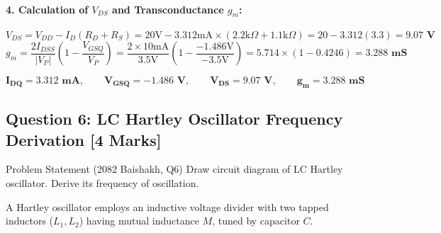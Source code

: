\documentclass[11pt,a4paper,oneside]{book}
\begin{document}
\paragraph{4. Calculation of $V_{DS}$ and Transconductance $g_m$:}
\[
V_{DS} = V_{DD} - I_D(R_D + R_S) = 20\text{V} - 3.312\text{mA} \times (2.2\text{k}\Omega + 1.1\text{k}\Omega) = 20 - 3.312(3.3) = \mathbf{9.07\text{ V}}
\]
\[
g_m = \frac{2 I_{DSS}}{|V_P|} \left(1 - \frac{V_{GSQ}}{V_P}\right) = \frac{2 \times 10\text{mA}}{3.5\text{V}} \left(1 - \frac{-1.486\text{V}}{-3.5\text{V}}\right) = 5.714 \times (1 - 0.4246) = \mathbf{3.288\text{ mS}}
\]

\begin{answerbox}
$$\mathbf{I_{DQ} = 3.312\text{ mA}, \qquad V_{GSQ} = -1.486\text{ V}, \qquad V_{DS} = 9.07\text{ V}, \qquad g_m = 3.288\text{ mS}}$$
\end{answerbox}

\vspace{0.6cm}

\subsection{Question 6: LC Hartley Oscillator Frequency Derivation [4 Marks]}
\begin{questionbox}{Problem Statement (2082 Baishakh, Q6)}
Draw circuit diagram of LC Hartley oscillator. Derive its frequency of oscillation.
\end{questionbox}

A Hartley oscillator employs an inductive voltage divider with two tapped inductors ($L_1, L_2$) having mutual inductance $M$, tuned by capacitor $C$.
\end{document}
